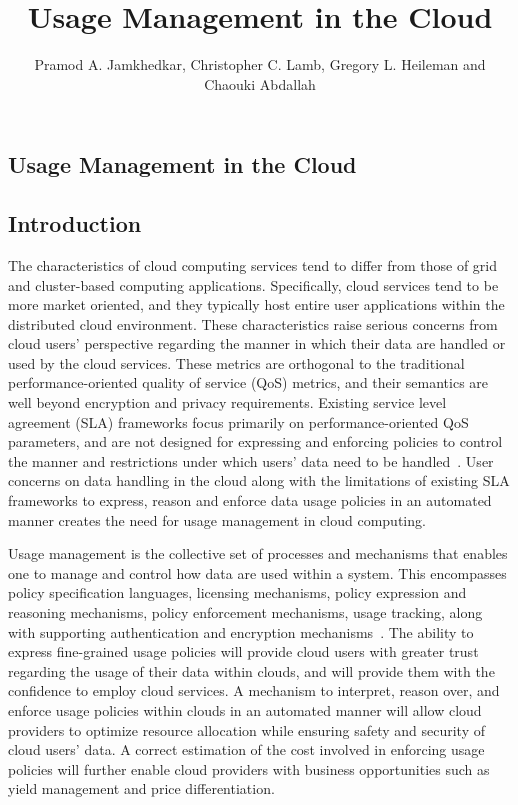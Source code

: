 \documentclass[notitlepage]{book}
\author{ Pramod A. Jamkhedkar, Christopher C. Lamb, Gregory L. Heileman and Chaouki Abdallah}
\title{Usage Management in the Cloud}
\begin{document}
\setlength{\parskip}{0pt}
\let\cleardoublepage\clearpage
{}
\begin{doublespace}
\maketitle 
\tableofcontents
{}
\chapter{Usage Management in the Cloud}
\section{Introduction}
The characteristics of cloud computing services tend to differ from those of grid and cluster-based computing applications.  Specifically, cloud services tend to be more market oriented, and they typically host entire user applications within the distributed cloud environment. These characteristics raise serious concerns from cloud users' perspective regarding the manner in which their data are handled or used by the cloud services. These metrics are orthogonal to the traditional performance-oriented quality of service (QoS) metrics, and their semantics are well beyond encryption and privacy requirements. Existing service level agreement (SLA) frameworks focus primarily on performance-oriented QoS parameters, and are not designed for expressing and enforcing policies to control the manner and restrictions under which users' data need to be handled~\cite{WSLA,WSA,PaRaSh:09,WSP}. User concerns on data handling in the cloud along with the limitations of existing SLA frameworks to express, reason and enforce data usage policies in an automated manner creates the need for usage management in cloud computing. 
 
Usage management is the collective set of processes and mechanisms that enables one to manage and control how data are
used within a system. This encompasses policy specification languages, licensing mechanisms, policy expression and reasoning mechanisms, policy enforcement mechanisms, usage tracking, along with supporting authentication and encryption mechanisms~\cite{JaHeLa:10,PaSa:04}. The ability to express fine-grained usage policies will provide cloud users with greater trust regarding the usage of their data within clouds, and will provide them with the confidence to employ cloud services. A mechanism to interpret, reason over, and enforce usage policies within clouds in an automated manner will allow cloud providers to optimize resource allocation while ensuring safety and security of cloud users' data. A correct estimation of the cost involved in enforcing usage policies will further enable cloud providers with business opportunities such as yield management and price differentiation. 


\end{doublespace}
\end{document}
